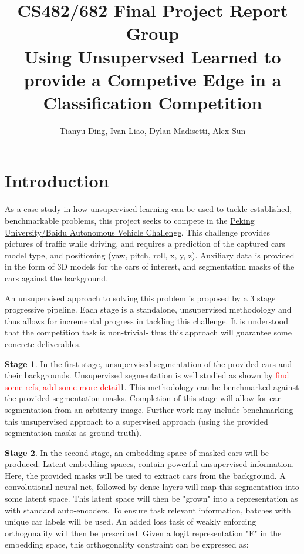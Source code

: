 \documentclass[twocolumn]{article}
\title{CS482/682 Final Project Report Group \todo{XX}\\
  \large Using Unsupervsed Learned to provide a Competive Edge in a Classification Competition}
\author{Tianyu Ding, Ivan Liao, Dylan Madisetti, Alex Sun}
\date{}
\newcommand{\todo}[1]{\textcolor{red}{#1}}
\begin{document}
  \maketitle

  \section{Introduction}

  As a case study in how unsupervised learning can be used to tackle
  established, benchmarkable problems, this project seeks to compete in the
  \href{https://www.kaggle.com/c/pku-autonomous-driving}{Peking University/Baidu
  Autonomous Vehicle Challenge}. This challenge provides pictures of traffic
  while driving, and requires a prediction of the captured cars model type, and
  positioning (yaw, pitch, roll, x, y, z). Auxiliary data is provided in the
  form of 3D models for the cars of interest, and segmentation masks of the cars
  against the background.

  An unsupervised approach to solving this problem is proposed by a 3 stage
  progressive pipeline. Each stage is a standalone, unsupervised methodology and
  thus allows for incremental progress in tackling this challenge. It is
  understood that the competition task is non-trivial- thus this approach will
  guarantee some concrete deliverables.

  \textbf{Stage 1}. In the first stage, unsupervised segmentation of the
  provided cars and their backgrounds. Unsupervised segmentation is well studied
  as shown by \todo{find some refs, add some more detail\ref{}}. This methodology can be benchmarked
  against the provided segmentation masks.  Completion of this stage will allow
  for car segmentation from an arbitrary image. Further work may include
  benchmarking this unsupervised approach to a supervised approach (using the
  provided segmentation masks as ground truth).

  \textbf{Stage 2}. In the second stage, an embedding space of masked cars will
  be produced. Latent embedding spaces, contain powerful unsupervised
  information. Here, the provided masks will be used to extract cars from the
  background. A convolutional neural net, followed by dense layers will map this
  segmentation into some latent space. This latent space will then be "grown"
  into a representation as with standard auto-encoders. To ensure task relevant
  information, batches with unique car labels will be used. An added loss task
  of weakly enforcing orthogonality will then be prescribed. Given a logit
  representation "E" in the embedding space, this orthogonality constraint can be
  expressed as:
\end{document}
